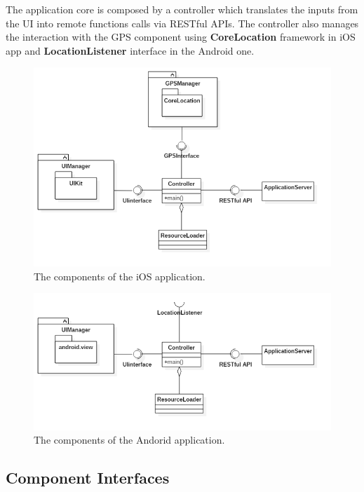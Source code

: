 The application core is composed by a controller which translates the inputs from the UI into remote functions calls via  RESTful APIs. The controller also manages the interaction with the GPS component using  \textbf{CoreLocation} framework in iOS app and \textbf{LocationListener} interface in the Android one.

\begin{figure}[H]
    \centering
    \includegraphics[width=\textwidth, keepaspectratio]{diagrams/iOS.png}
    \caption{The components of the iOS application.}
    \label{fig:ios-app}
\end{figure}

\begin{figure}[H]
    \centering
    \includegraphics[width=\textwidth, keepaspectratio]{diagrams/Android.png}
    \caption{The components of the Andorid application.}
    \label{fig:android-app}
\end{figure}

\subsection{Component Interfaces}

